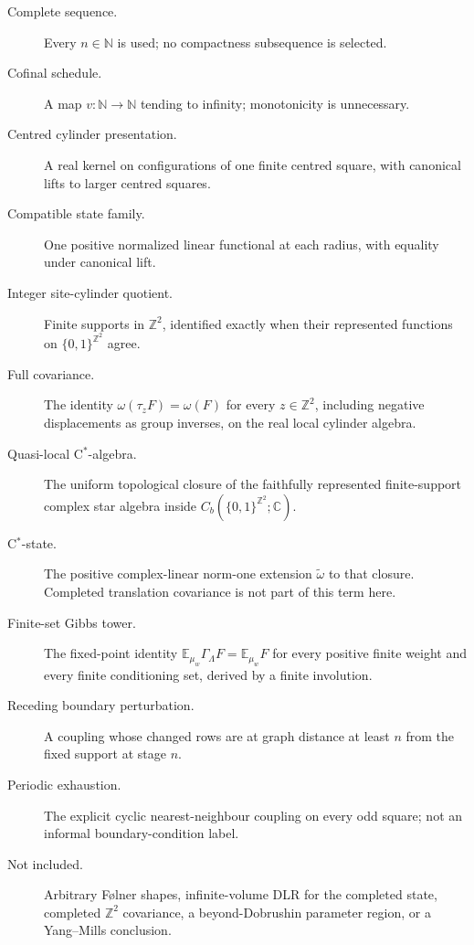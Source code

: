 \documentclass[11pt]{article}
\theoremstyle{definition}
\newcommand{\N}{\mathbb N}
\newcommand{\Z}{\mathbb Z}
\newcommand{\E}{\mathbb E}
\begin{document}
\begin{description}
\item[Complete sequence.] Every $n\in\N$ is used; no compactness subsequence is
  selected.
\item[Cofinal schedule.] A map $v:\N\to\N$ tending to infinity; monotonicity is
  unnecessary.
\item[Centred cylinder presentation.] A real kernel on configurations of one
  finite centred square, with canonical lifts to larger centred squares.
\item[Compatible state family.] One positive normalized linear functional at
  each radius, with equality under canonical lift.
\item[Integer site-cylinder quotient.] Finite supports in $\Z^2$, identified
  exactly when their represented functions on $\{0,1\}^{\Z^2}$ agree.
\item[Full covariance.] The identity $\omega(\tau_zF)=\omega(F)$ for every
  $z\in\Z^2$, including negative displacements as group inverses, on the real
  local cylinder algebra.
\item[Quasi-local C$^*$-algebra.] The uniform topological closure of the
  faithfully represented finite-support complex star algebra inside
  $C_b(\{0,1\}^{\Z^2};\mathbb C)$.
\item[C$^*$-state.] The positive complex-linear norm-one extension
  $\widetilde\omega$ to that closure.  Completed translation covariance is not
  part of this term here.
\item[Finite-set Gibbs tower.] The fixed-point identity
  $\E_{\mu_w}\Gamma_\Lambda F=\E_{\mu_w}F$ for every positive finite weight
  and every finite conditioning set, derived by a finite involution.
\item[Receding boundary perturbation.] A coupling whose changed rows are at
  graph distance at least $n$ from the fixed support at stage $n$.
\item[Periodic exhaustion.] The explicit cyclic nearest-neighbour coupling on
  every odd square; not an informal boundary-condition label.
\item[Not included.] Arbitrary F\o lner shapes, infinite-volume DLR for the
  completed state, completed $\Z^2$ covariance, a beyond-Dobrushin parameter
  region, or a Yang--Mills conclusion.
\end{description}
\end{document}
